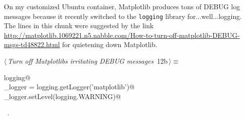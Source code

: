 \documentclass[11.5pt]{report}
\begin{document}

\newchunk On my customized Ubuntu container, Matplotlib produces tons of DEBUG log messages because  
it recently switched to the \verb|logging| library for...well...logging. 
The lines in this chunk were suggested by the link \url{http://matplotlib.1069221.n5.nabble.com/How-to-turn-off-matplotlib-DEBUG-msgs-td48822.html} 
for quietening down Matplotlib.  


\begin{flushleft} \small
\begin{minipage}{\linewidth}\label{scrap2}\raggedright\small
{} $\langle\,${\itshape Turn off Matplotlibs irritating DEBUG messages}\nobreak\ {\footnotesize {12b}}$\,\rangle\equiv$
\vspace{-1ex}
\begin{list}{}{} \item
\mbox{}\verb@import logging@\\
\mbox{}\verb@mpl_logger = logging.getLogger('matplotlib')@\\
\mbox{}\verb@mpl_logger.setLevel(logging.WARNING)@\\
\mbox{}\verb@@{\NWsep}
\end{list}
\vspace{-1.5ex}
\footnotesize
\begin{list}{}{\setlength{\itemsep}{-\parsep}\setlength{\itemindent}{-\leftmargin}}
\item \NWtxtMacroRefIn\ .

\item{}
\end{list}
\end{minipage}\vspace{4ex}
\end{flushleft}
\end{document}
